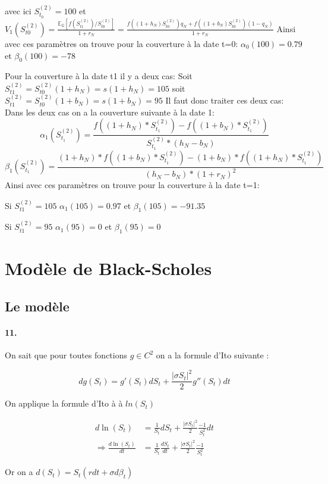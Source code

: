 \documentclass[10pt]{article}
\begin{document}
  avec ici $S^{(2)}_{t_{0}}=100$ et $V_{1}(S_{t0}^{(2)})= \frac{\mathbb{E}_{\mathbb{Q}}[f(S_{t1}^{(2)}) \slash S_{t0}^{(2)}]}{1+r_N}=\frac{f((1+h_N)S_{t0}^{(2)})q_N + f((1+b_N)S_{t0}^{(2)})(1-q_N)}{1+r_N}$
  Ainsi avec ces paramètres on trouve pour la couverture à la date t=0:
  $\alpha_0(100)=0.79$ et $\beta_0(100)=-78$
  
  Pour la couverture à la date t1 il y a deux cas:
  Soit $S_{t1}^{(2)}=S_{t0}^{(2)}(1+h_N)=s(1+h_N)=105$ soit $S_{t1}^{(2)}=S_{t0}^{(2)}(1+b_N)=s(1+b_N)=95$
  Il faut donc traiter ces deux cas:
  Dans les deux cas on a la couverture suivante à la date 1:
  $$
  \boxed{\alpha_{1}(S^{(2)}_{t_{1}}) = \frac{f( (1+h_N)*S^{(2)}_{t_{1}}) - f( (1+b_N)*S^{(2)}_{t_{1}})}{S^{(2)}_{t_{1}} * (h_N - b_N)}}
  $$
  $$
  \boxed{\beta_{1} (S^{(2)}_{t_{1}}) = \frac{(1+h_N)*f( (1+b_N)*S^{(2)}_{t_{1}}) - (1+b_N)*f( (1+h_N)*S^{(2)}_{t_{1}})}{(h_N - b_N)*(1+r_N)^2}}
  $$
  Ainsi avec ces paramètres on trouve pour la couverture à la date t=1:
  
  Si   $S_{t1}^{(2)}=105$    $\alpha_1(105)=0.97$ et $\beta_1(105)=-91.35$
  
  Si   $S_{t1}^{(2)}=95$    $\alpha_1(95)=0$ et $\beta_1(95)=0$
  
  \section{Modèle de Black-Scholes}
  \subsection{Le modèle}
  \paragraph{11.}
  On sait que pour toutes fonctions $g \in {C^2} $ on a la formule d'Ito suivante :
  
  $$ dg(S_t) = g'(S_t)dS_t + \frac{|\sigma S_t|^2}{2}g''(S_t)dt $$
  
  On applique la formule d'Ito à à $ln(S_t)$
  
  
  \begin{align*}
    d\ln(S_t) &= \frac{1}{S_t}dS_t + \frac{|\sigma S_t|^2}{2}\frac{-1}{S_t^2}dt \\
    \Rightarrow \frac{d\ln(S_t)}{dt} &= \frac{1}{S_t}\frac{dS_t}{dt} + \frac{|\sigma S_t|^2}{2}\frac{-1}{S_t^2}
  \end{align*}
  
  Or on a $ d(S_t) = S_t(rdt + \sigma d \beta_t)$
  
\end{document}
